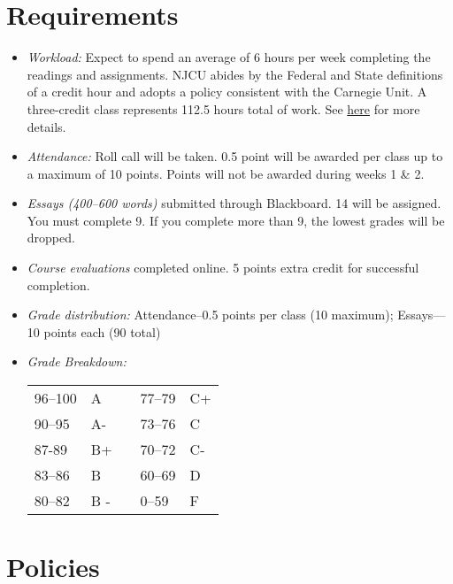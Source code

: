 \documentclass[article,oneside]{memoir}
\begin{document}
\section{Requirements}


\begin{itemize}
\item \textit{Workload:} Expect to spend an average of 6 hours per week completing the readings and assignments. NJCU abides by the Federal and State definitions of a credit hour and adopts a policy consistent with the Carnegie Unit. A three-credit class represents 112.5 hours total of work. See \href{http://scoconno.github.io/Teaching/Credit.pdf}{here} for more details.

\item \textit{Attendance:} Roll call will be taken. 0.5 point will be awarded per class up to a maximum of 10 points. Points will not be awarded during weeks 1 \& 2. 


\item \textit{Essays (400--600 words)} submitted through Blackboard.  14 will be assigned. You must complete 9. If you complete more than 9, the lowest grades will be dropped. 


\item \textit{Course evaluations} completed online. 5 points extra credit for successful completion.
  
\item \textit{Grade distribution:} Attendance--0.5 points per class (10 maximum);  Essays---10 points each (90 total)

\item \textit{Grade Breakdown:}

 \begin{tabular}{ | l | l | p{2cm} | l | l | }
    \hline 
96--100 & A  & &  77--79 &  C+ \\  
90--95 & A- & &  73--76 & C \\
87-89 & B+ &  &  70--72 & C- \\ 
83--86 & B  & &  60--69 & D\\
80--82 & B - & & 0--59 & F\\ \hline
    \end{tabular}


\end{itemize}


\section{Policies}
\end{document}
